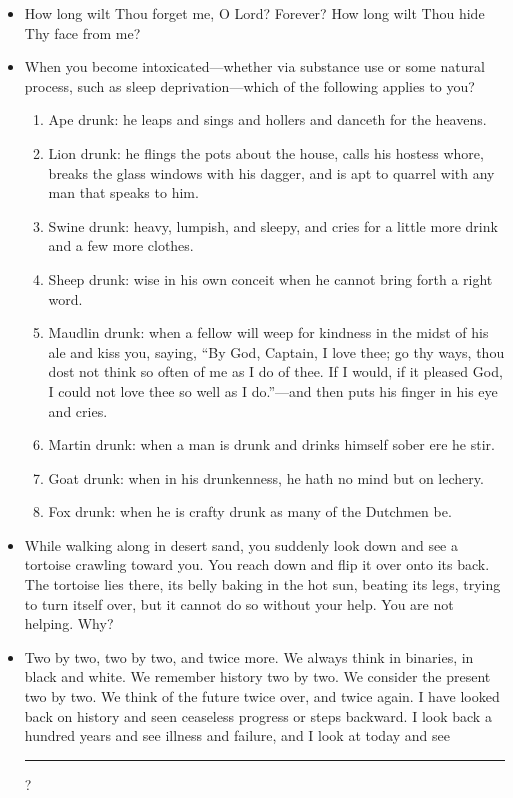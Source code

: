 \begin{itemize}
\tightlist
\item
  How long wilt Thou forget me, O Lord? Forever? How long wilt Thou hide Thy face from me?
\item
  When you become intoxicated---whether via substance use or some natural process, such as sleep deprivation---which of the following applies to you?

  \begin{enumerate}
  \def\labelenumi{\arabic{enumi}.}
  \tightlist
  \item
    Ape drunk: he leaps and sings and hollers and danceth for the heavens.
  \item
    Lion drunk: he flings the pots about the house, calls his hostess whore, breaks the glass windows with his dagger, and is apt to quarrel with any man that speaks to him.
  \item
    Swine drunk: heavy, lumpish, and sleepy, and cries for a little more drink and a few more clothes.
  \item
    Sheep drunk: wise in his own conceit when he cannot bring forth a right word.
  \item
    Maudlin drunk: when a fellow will weep for kindness in the midst of his ale and kiss you, saying, ``By God, Captain, I love thee; go thy ways, thou dost not think so often of me as I do of thee. If I would, if it pleased God, I could not love thee so well as I do.''---and then puts his finger in his eye and cries.
  \item
    Martin drunk: when a man is drunk and drinks himself sober ere he stir.
  \item
    Goat drunk: when in his drunkenness, he hath no mind but on lechery.
  \item
    Fox drunk: when he is crafty drunk as many of the Dutchmen be.
  \end{enumerate}
\item
  While walking along in desert sand, you suddenly look down and see a tortoise crawling toward you. You reach down and flip it over onto its back. The tortoise lies there, its belly baking in the hot sun, beating its legs, trying to turn itself over, but it cannot do so without your help. You are not helping. Why?
\item
  Two by two, two by two, and twice more. We always think in binaries, in black and white. We remember history two by two. We consider the present two by two. We think of the future twice over, and twice again. I have looked back on history and seen ceaseless progress or steps backward. I look back a hundred years and see illness and failure, and I look at today and see \rule{5em}{0.75pt}?

\end{itemize}
